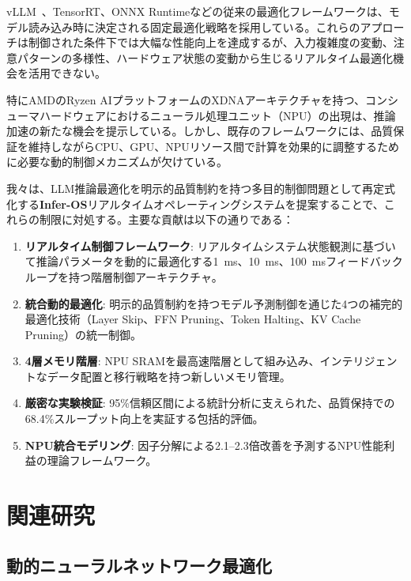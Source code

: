 \documentclass[10pt,twocolumn,a4paper]{jarticle}
\begin{document}
vLLM~\cite{vllm2023}、TensorRT、ONNX Runtimeなどの従来の最適化フレームワークは、モデル読み込み時に決定される固定最適化戦略を採用している。これらのアプローチは制御された条件下では大幅な性能向上を達成するが、入力複雑度の変動、注意パターンの多様性、ハードウェア状態の変動から生じるリアルタイム最適化機会を活用できない。

特にAMDのRyzen AIプラットフォームのXDNAアーキテクチャを持つ、コンシューマハードウェアにおけるニューラル処理ユニット（NPU）の出現は、推論加速の新たな機会を提示している。しかし、既存のフレームワークには、品質保証を維持しながらCPU、GPU、NPUリソース間で計算を効果的に調整するために必要な動的制御メカニズムが欠けている。

我々は、LLM推論最適化を明示的品質制約を持つ多目的制御問題として再定式化する\textbf{Infer-OS}リアルタイムオペレーティングシステムを提案することで、これらの制限に対処する。主要な貢献は以下の通りである：

\begin{enumerate}
\item \textbf{リアルタイム制御フレームワーク}: リアルタイムシステム状態観測に基づいて推論パラメータを動的に最適化する\SI{1}{ms}、\SI{10}{ms}、\SI{100}{ms}フィードバックループを持つ階層制御アーキテクチャ。

\item \textbf{統合動的最適化}: 明示的品質制約を持つモデル予測制御を通じた4つの補完的最適化技術（Layer Skip、FFN Pruning、Token Halting、KV Cache Pruning）の統一制御。

\item \textbf{4層メモリ階層}: NPU SRAMを最高速階層として組み込み、インテリジェントなデータ配置と移行戦略を持つ新しいメモリ管理。

\item \textbf{厳密な実験検証}: 95\%信頼区間による統計分析に支えられた、品質保持での68.4\%スループット向上を実証する包括的評価。

\item \textbf{NPU統合モデリング}: 因子分解による2.1--2.3倍改善を予測するNPU性能利益の理論フレームワーク。
\end{enumerate}

\section{関連研究}

\subsection{動的ニューラルネットワーク最適化}
\end{document}
